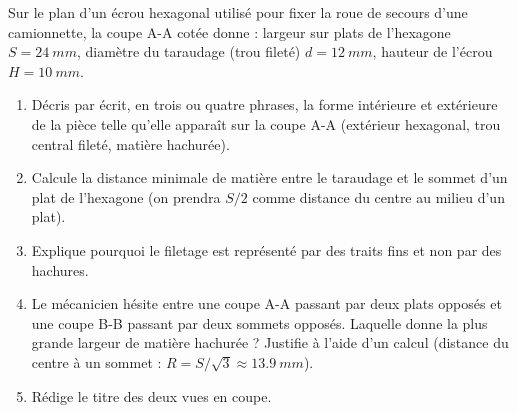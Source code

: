 \documentclass[11pt]{article}
\begin{document}
\begin{exercice}
Sur le plan d'un écrou hexagonal utilisé pour fixer la roue de secours d'une camionnette, la coupe A-A cotée donne : largeur sur plats de l'hexagone $S = \SI{24}{mm}$, diamètre du taraudage (trou fileté) $d = \SI{12}{mm}$, hauteur de l'écrou $H = \SI{10}{mm}$.
\begin{enumerate}
\item Décris par écrit, en trois ou quatre phrases, la forme intérieure et extérieure de la pièce telle qu'elle apparaît sur la coupe A-A (extérieur hexagonal, trou central fileté, matière hachurée).
\item Calcule la distance minimale de matière entre le taraudage et le sommet d'un plat de l'hexagone (on prendra $S/2$ comme distance du centre au milieu d'un plat).
\item Explique pourquoi le filetage est représenté par des traits fins et non par des hachures.
\item Le mécanicien hésite entre une coupe A-A passant par deux plats opposés et une coupe B-B passant par deux sommets opposés. Laquelle donne la plus grande largeur de matière hachurée ? Justifie à l'aide d'un calcul (distance du centre à un sommet : $R = S / \sqrt{3} \approx \SI{13,9}{mm}$).
\item Rédige le titre des deux vues en coupe.
\end{enumerate}
\end{exercice}
\end{document}
